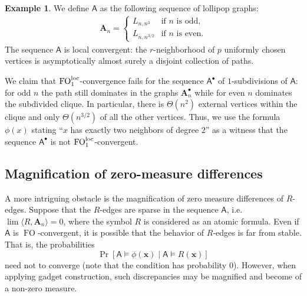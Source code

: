 \documentclass[11pt]{article}
\theoremstyle{plain}
\theoremstyle{definition}
\newtheorem{example}{Example}
\theoremstyle{remark}
\DeclareMathOperator\FO{FO}
\newcommand{\FOloc}[1]{\FO_{#1}^\textnormal{loc}}
\newcommand{\stonepar}[2]{\langle #1, #2 \rangle}
\newcommand{\str}[1]{\mathbf{#1}}
\newcommand{\strseq}[1]{{\boldsymbol{\mathsf{#1}}}}
\newcommand{\tpl}[1]{{\bm{#1}}}
\begin{document}
\begin{example}\label{ex:counterexample_subdivision}
    We define $\strseq{A}$ as the following sequence of lollipop graphs:
    \begin{align*}
        \str{A}_n =
        \begin{cases}
            L_{n, n^3} & \text{if $n$ is odd}, \\
            L_{n, n^{3/2}} & \text{if $n$ is even}.
        \end{cases}
    \end{align*}
    The sequence $\strseq{A}$ is local convergent:
    the $r$-neighborhood of $p$ uniformly chosen vertices is asymptotically almost surely a disjoint collection of paths.
    
    We claim that $\FOloc{1}$-convergence fails for the sequence $\strseq{A}^\bullet$ of $1$-subdivisions of $\strseq{A}$:
    for odd $n$ the path still dominates in the graphs $\str{A}^\bullet_n$ while for even $n$ dominates the subdivided clique.
    In particular, there is $\Theta(n^2)$ external vertices within the clique and only $\Theta(n^{3/2})$ of all the other vertices.
    Thus, we use the formula $\phi(x)$ stating ``$x$ has exactly two neighbors of degree $2$'' as a witness that the sequence $\strseq{A}^\bullet$ is not $\FOloc{1}$-convergent.
\end{example}

\subsection{Magnification of zero-measure differences}\label{ssec:magnification_of_zero_measure_differences}

A more intriguing obstacle is the magnification of zero measure differences of $R$-edges.
Suppose that the $R$-edges are sparse in the sequence $\strseq{A}$, i.e. $\lim \stonepar{R}{\str{A}_n} = 0$, where the symbol $R$ is considered as an atomic formula.
Even if $\strseq{A}$ is $\FO$-convergent, it is possible that the behavior of $R$-edges is far from stable.
That is, the probabilities
\[
    \Pr[\strseq{A} \models \phi(\tpl{x}) \;|\; \strseq{A} \models R(\tpl{x})]
\]
need not to converge (note that the condition has probability $0$).
However, when applying gadget construction, such discrepancies may be magnified and become of a non-zero measure.
\end{document}
